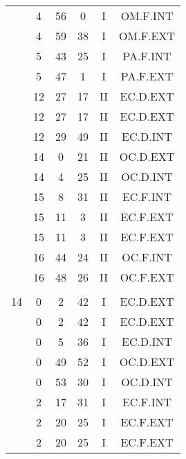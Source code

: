 \documentclass[12pt, a4paper]{article}
\begin{document}
\begin{multicols}{3}
{\begin{tabular}{c c c c c c}
	 	 	 	 & 4 & 56 & 0 & I & OM.F.INT\\%
	 	 	 	 & 4 & 59 & 38 & I & OM.F.EXT\\%
	 	 	 	 & 5 & 43 & 25 & I & PA.F.INT\\%
	 	 	 	 & 5 & 47 & 1 & I & PA.F.EXT\\%
	 	 	 	 & 12 & 27 & 17 & II & EC.D.EXT\\%
	 	 	 	 & 12 & 27 & 17 & II & EC.D.EXT\\%
	 	 	 	 & 12 & 29 & 49 & II & EC.D.INT\\%
	 	 	 	 & 14 & 0 & 21 & II & OC.D.EXT\\%
	 	 	 	 & 14 & 4 & 25 & II & OC.D.INT\\%
	 	 	 	 & 15 & 8 & 31 & II & EC.F.INT\\%
	 	 	 	 & 15 & 11 & 3 & II & EC.F.EXT\\%
	 	 	 	 & 15 & 11 & 3 & II & EC.F.EXT\\%
	 	 	 	 & 16 & 44 & 24 & II & OC.F.INT\\%
	 	 	 	 & 16 & 48 & 26 & II & OC.F.EXT\\%
	 	 	 	 & & & & & \\%
	 	 	 	14 & 0 & 2 & 42 & I & EC.D.EXT\\%
	 	 	 	 & 0 & 2 & 42 & I & EC.D.EXT\\%
	 	 	 	 & 0 & 5 & 36 & I & EC.D.INT\\%
	 	 	 	 & 0 & 49 & 52 & I & OC.D.EXT\\%
	 	 	 	 & 0 & 53 & 30 & I & OC.D.INT\\%
	 	 	 	 & 2 & 17 & 31 & I & EC.F.INT\\%
	 	 	 	 & 2 & 20 & 25 & I & EC.F.EXT\\%
	 	 	 	 & 2 & 20 & 25 & I & EC.F.EXT\\%

\end{tabular}}
\end{multicols}
\end{document}
